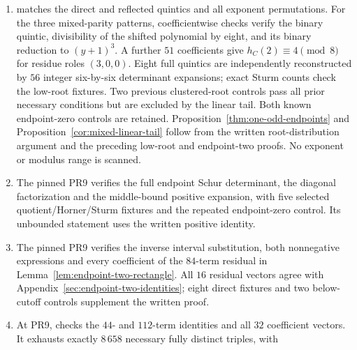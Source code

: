 \begin{enumerate}
two third-shift identities. Four derivative residues and sixteen binary
shift-parity patterns display the resulting necessary conditions.
Eight fixtures independently reconstruct full quintics with $56$ integer
six-by-six determinant expansions; another $48$ five-by-five principal
cofactors reconstruct their derivatives at $b$. Two fixtures have
$h_C(b)=0$ and satisfy the derivative divisor but fail the third-shift
condition. Four compatible controls retain nonlinear rational factors.
The arithmetic conditions in Proposition~\ref{thm:clustered-odd-roots} use
the root-clustering proof in Appendix~\ref{sec:two-adic-lifting}, with no
exponent or modulus range scan.
\item {} matches the direct
and reflected quintics and all exponent permutations. For the three
mixed-parity patterns, coefficientwise checks verify the binary quintic,
divisibility of the shifted polynomial by eight, and its binary reduction
to $(y+1)^3$. A further $51$ coefficients give $h_C(2)\equiv4\pmod8$
for residue roles $(3,0,0)$. Eight full quintics are independently
reconstructed by $56$ integer six-by-six determinant expansions;
exact Sturm counts check the low-root fixtures. Two previous clustered-root
controls pass all prior necessary conditions but are excluded by the
linear tail. Both known endpoint-zero controls are retained.
Proposition~\ref{thm:one-odd-endpoints} and
Proposition~\ref{cor:mixed-linear-tail} follow from the written root-distribution
argument and the preceding low-root and endpoint-two proofs.
No exponent or modulus range is scanned.
\item The pinned PR9  verifies
the full endpoint Schur determinant, the diagonal factorization and
the middle-bound positive expansion, with five selected quotient/Horner/Sturm
fixtures and the repeated endpoint-zero control. Its unbounded statement
uses the written positive identity.
\item The pinned PR9  verifies
the inverse interval substitution, both nonnegative expressions and every
coefficient of the $84$-term residual in
Lemma~\ref{lem:endpoint-two-rectangle}. All $16$ residual vectors agree
with Appendix~\ref{sec:endpoint-two-identities}; eight direct fixtures
and two below-cutoff controls supplement the written proof.
\item At PR9,  checks the
$44$- and $112$-term identities and all $32$ coefficient vectors.
It exhausts exactly $8\,658$ necessary fully distinct triples, with

\end{enumerate}
